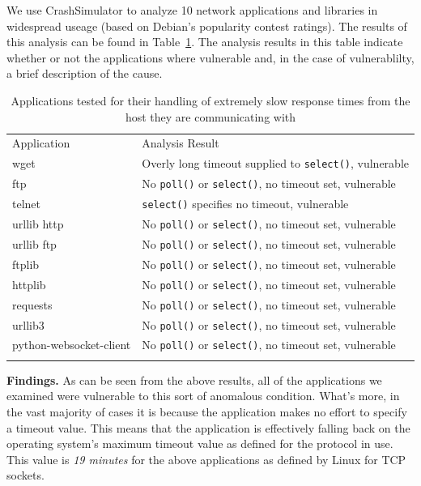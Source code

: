 We use CrashSimulator to analyze 10 network applications and libraries in
widespread useage (based on Debian's popularity contest ratings).  The results
of this analysis can be found in Table~\ref{table:slowloris}.  The analysis results in
this table indicate whether or not the applications where vulnerable and, in the
case of vulnerablilty, a brief description of the cause.

\begin{table}[t]
  \scriptsize{}
  \begin{tabular}{l | l}
    \toprule{}
    Application              & Analysis Result\\
    wget                     & Overly long timeout supplied to {\tt select()}, vulnerable\\
    ftp                      & No {\tt poll()} or {\tt select()}, no timeout set, vulnerable\\
    telnet                   & {\tt select()} specifies no timeout, vulnerable\\
    urllib http              & No {\tt poll()} or {\tt select()}, no timeout set, vulnerable\\
    urllib ftp               & No {\tt poll()} or {\tt select()}, no timeout set, vulnerable\\
    ftplib                   & No {\tt poll()} or {\tt select()}, no timeout set, vulnerable\\
    httplib                  & No {\tt poll()} or {\tt select()}, no timeout set, vulnerable\\
    requests                 & No {\tt poll()} or {\tt select()}, no timeout set, vulnerable\\
    urllib3                  & No {\tt poll()} or {\tt select()}, no timeout set, vulnerable\\
    python-websocket-client  & No {\tt poll()} or {\tt select()}, no timeout set, vulnerable\\
    \bottomrule{}
  \end{tabular}
  \caption{Applications tested for their handling of extremely slow response
    times from the host they are communicating with}
  \label{table:slowloris}
\end{table}


{\bf Findings.}
As can be seen from the above results, all of the applications we examined were
vulnerable to this sort of anomalous condition.  What's more, in the vast
majority of cases it is because the application makes no effort to specify a
timeout value.  This means that the application is effectively falling back on
the operating system's maximum timeout value as defined for the protocol in
use.  This value is \emph{19 minutes} for the above applications as defined by
Linux for TCP sockets.

